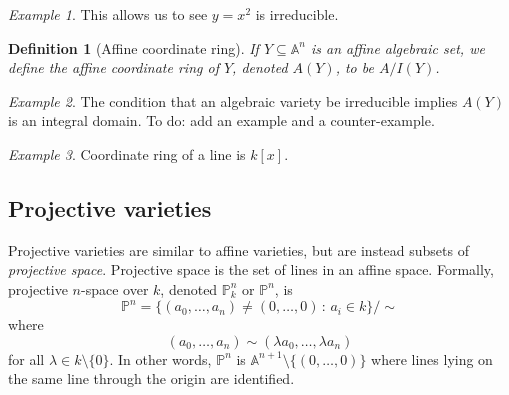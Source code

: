 \documentclass[12pt]{amsart}
\newcommand{\An}{\mathbb{A}^n}
\newcommand{\Pn}{\mathbb{P}^n}
\newtheorem{definition}[theorem]{Definition}
\theoremstyle{remark}
\theoremstyle{remark}
\newtheorem*{example}{Example}
\theoremstyle{remark}
\begin{document}
\begin{example}
This allows us to see $y = x^2$ is irreducible.
\end{example}

\begin{definition}[Affine coordinate ring]
If $Y \subseteq \An$ is an affine algebraic set, we define the affine coordinate ring of $Y$, denoted $A(Y)$, to be $A/I(Y)$.
\end{definition}

\begin{example}
The condition that an algebraic variety be irreducible implies $A(Y)$ is an integral domain.
To do: add an example and a counter-example.
\end{example}

\begin{example}
Coordinate ring of a line is $k[x]$.
\end{example}

\subsection{Projective varieties}
Projective varieties are similar to affine varieties, but are instead subsets of \emph{projective space}.
Projective space is the set of lines in an affine space.
Formally, projective $n$-space over $k$, denoted $\Pn_k$ or $\Pn$, is
$$\Pn = \{(a_0, \ldots, a_n) \ne (0, \ldots, 0) \, : \, a_i \in k \} / \sim$$
where
$$(a_0, \ldots, a_n) \sim (\lambda a_0, \ldots, \lambda a_n)$$
for all $\lambda \in k \setminus \{0\}$.
In other words, $\Pn$ is $\mathbb{A}^{n+1} \setminus \{(0, \ldots, 0)\}$ where lines lying on the same line through the origin are identified.

%
%
%
\end{document}
